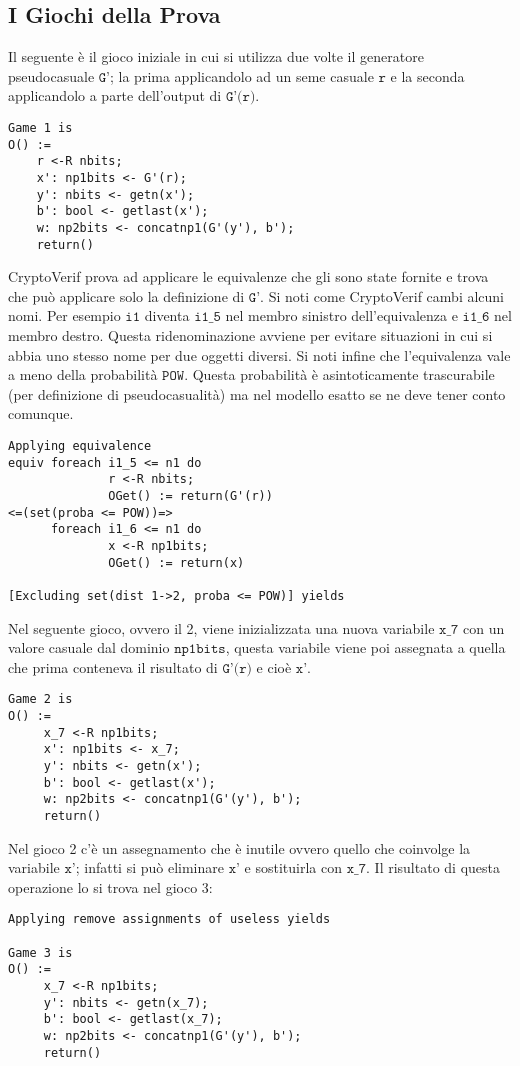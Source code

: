 \documentclass[a4paper,openright,twoside,12pt]{report}
\begin{document}
  \subsection{I Giochi della Prova}
Il seguente \`e il gioco iniziale in cui si utilizza due volte il generatore pseudocasuale $\texttt{G'}$; 
la prima applicandolo ad un seme casuale $\texttt{r}$ e la seconda applicandolo a parte dell'output di $\texttt{G'(r)}$.
\begin{verbatim}
Game 1 is
O() :=
    r <-R nbits;
    x': np1bits <- G'(r);
    y': nbits <- getn(x');
    b': bool <- getlast(x');
    w: np2bits <- concatnp1(G'(y'), b');
    return()
\end{verbatim}
CryptoVerif prova ad applicare le equivalenze che gli sono state fornite e trova che pu\`o applicare solo la definizione di $\texttt{G'}$.
Si noti come CryptoVerif cambi alcuni nomi. Per esempio $\texttt{i1}$ diventa $\texttt{i1\_5}$ nel membro sinistro dell'equivalenza e $\texttt{i1\_6}$ nel membro destro.
Questa ridenominazione avviene per evitare situazioni in cui si abbia uno stesso nome per due oggetti diversi. 
Si noti infine che l'equivalenza vale a meno della probabilit\`a $\texttt{POW}$. Questa probabilit\`a \`e asintoticamente trascurabile (per definizione di pseudocasualit\`a)
ma nel modello esatto se ne deve tener conto comunque.
\begin{verbatim}
Applying equivalence
equiv foreach i1_5 <= n1 do 
              r <-R nbits; 
              OGet() := return(G'(r))
<=(set(proba <= POW))=>
      foreach i1_6 <= n1 do 
              x <-R np1bits; 
              OGet() := return(x)

[Excluding set(dist 1->2, proba <= POW)] yields
\end{verbatim}
Nel seguente gioco, ovvero il 2, viene inizializzata una nuova variabile $\texttt{x\_7}$ con un valore casuale dal dominio  $\texttt{np1bits}$, questa variabile viene poi assegnata a quella che prima
conteneva il risultato di $\texttt{G'(r)}$ e cio\`e $\texttt{x'}$.
\begin{verbatim} 
Game 2 is
O() :=
     x_7 <-R np1bits; 
     x': np1bits <- x_7;
     y': nbits <- getn(x');
     b': bool <- getlast(x');
     w: np2bits <- concatnp1(G'(y'), b');
     return()
\end{verbatim}
Nel gioco 2 c'\`e un assegnamento che \`e inutile ovvero quello che coinvolge la variabile $\texttt{x'}$; infatti si pu\`o eliminare  $\texttt{x'}$ e sostituirla con  $\texttt{x\_7}$. 
Il risultato di questa operazione lo si trova nel gioco 3:
\begin{verbatim} 
Applying remove assignments of useless yields

Game 3 is
O() :=
     x_7 <-R np1bits;
     y': nbits <- getn(x_7);
     b': bool <- getlast(x_7);
     w: np2bits <- concatnp1(G'(y'), b');
     return()
\end{verbatim}
\end{document}
